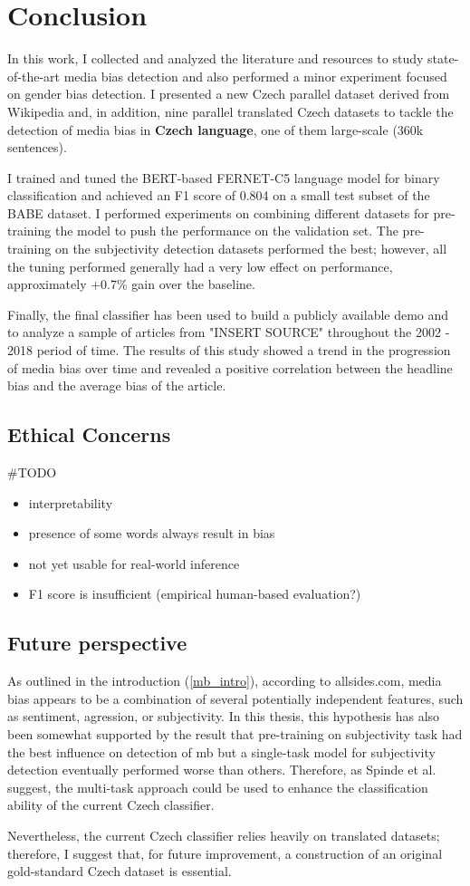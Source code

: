 \chapter{Conclusion}
In this work, I collected and analyzed the literature and resources to study state-of-the-art media bias detection and also performed a minor experiment focused on gender bias detection. I presented a new Czech parallel dataset derived from Wikipedia and, in addition, nine parallel translated Czech datasets to tackle the detection of media bias in \textbf{Czech language}, one of them large-scale (360k sentences).

I trained and tuned the BERT-based FERNET-C5 language model for binary classification and achieved an F1 score of 0.804 on a small test subset of the BABE dataset. I performed experiments on combining different datasets for pre-training the model to push the performance on the validation set. The pre-training on the subjectivity detection datasets performed the best; however, all the tuning performed generally had a very low effect on performance, approximately +0.7\% gain over the baseline. 

Finally, the final classifier has been used to build a publicly available demo and to analyze a sample of articles from "INSERT SOURCE" throughout the 2002 - 2018 period of time. The results of this study showed a trend in the progression of media bias over time and revealed a positive correlation between the headline bias and the average bias of the article.

\section{Ethical Concerns}
\#TODO
\begin{itemize}
    \item interpretability
    \item presence of some words always result in bias
    \item not yet usable for real-world inference
    \item F1 score is insufficient (empirical human-based evaluation?)
\end{itemize}


\section{Future perspective}
As outlined in the introduction (\ref{mb_intro}), according to allsides.com, media bias appears to be a combination of several potentially independent features, such as sentiment, agression, or subjectivity. In this thesis, this hypothesis has also been somewhat supported by the result that pre-training on subjectivity task had the best influence on detection of \gls{mb} but a single-task model for subjectivity detection eventually performed worse than others. Therefore, as Spinde et al. \cite{spindeexploiting} suggest, the multi-task approach could be used to enhance the classification ability of the current Czech classifier.


Nevertheless, the current Czech classifier relies heavily on translated datasets; therefore, I suggest that, for future improvement, a construction of an original gold-standard Czech dataset is essential.
